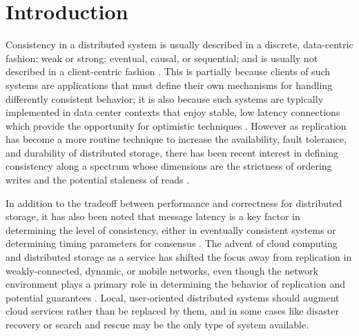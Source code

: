 \documentclass[letterpaper,twocolumn,10pt]{article}
\begin{document}
\section{Introduction}




Consistency in a distributed system is usually described in a discrete, data-centric fashion: weak or strong; eventual, causal, or sequential; and is usually not described in a client-centric fashion \cite{bermbach_consistency_2013}. This is partially because clients of such systems are applications that must define their own mechanisms for handling differently consistent behavior; it is also because such systems are typically implemented in data center contexts that enjoy stable, low latency connections which provide the opportunity for optimistic techniques \cite{bailis_quantifying_2014}. However as replication has become a more routine technique to increase the availability, fault tolerance, and durability of distributed storage, there has been recent interest in defining consistency along a spectrum whose dimensions are the strictness of ordering writes and the potential staleness of reads \cite{li_making_2012,yu_design_2002,afek_quasi-linearizability:_2010,al-ekram_multi-consistency_2010,krishnamurthy_adaptive_2002,bermbach_metastorage:_2011}.


In addition to the tradeoff between performance and correctness for distributed storage, it has also been noted that message latency is a key factor in determining the level of consistency, either in eventually consistent systems \cite{bailis_probabilistically_2012} or determining timing parameters for consensus \cite{howard_raft_2015}. The advent of cloud computing and distributed storage as a service \cite{chihoub_consistency_2013,chihoub_harmony:_2012,kraska_consistency_2009} has shifted the focus away from replication in weakly-connected, dynamic, or mobile networks, even though the network environment plays a primary role in determining the behavior of replication and potential guarantees \cite{deno-toc,pitoura_data_1999,glynn_multi-consistency_2005}. Local, user-oriented distributed systems should augment cloud services rather than be replaced by them, and in some cases like disaster recovery or search and rescue may be the only type of system available.
\end{document}
